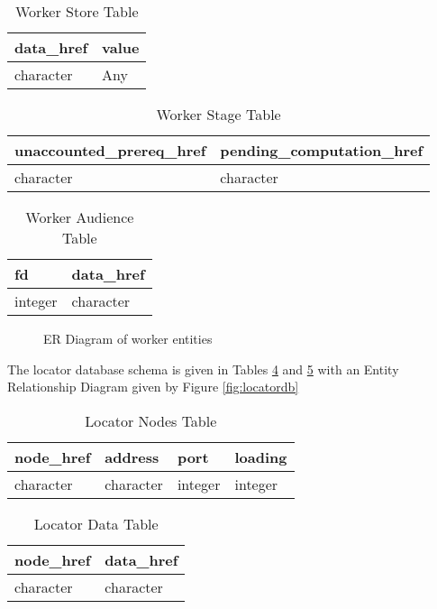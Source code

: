 \begin{table}[]
\caption{Worker Store Table}
\label{tbl:wstore}
\begin{tabular}{@{}ll@{}}
\toprule
data\_href & value \\ \midrule
character  & Any   \\ \bottomrule
\end{tabular}
\end{table}

\begin{table}[]
\caption{Worker Stage Table}
\label{tbl:wstage}
\begin{tabular}{@{}ll@{}}
\toprule
unaccounted\_prereq\_href & pending\_computation\_href \\ \midrule
character                 & character                  \\ \bottomrule
\end{tabular}
\end{table}

\begin{table}[]
\caption{Worker Audience Table}
\label{tbl:waudience}
\begin{tabular}{@{}ll@{}}
\toprule
fd      & data\_href \\ \midrule
integer & character  \\ \bottomrule
\end{tabular}
\end{table}


\begin{figure}

\caption{ER Diagram of worker entities}
\label{fig:workerdb}
\end{figure}

The locator database schema is given in Tables \cref{tbl:lnodes} and \cref{tbl:ldata} with an Entity Relationship Diagram given by Figure \cref{fig:locatordb}


\begin{table}[]
\caption{Locator Nodes Table}
\label{tbl:lnodes}
\begin{tabular}{@{}llll@{}}
\toprule
node\_href & address   & port    & loading \\ \midrule
character  & character & integer & integer \\ \bottomrule
\end{tabular}
\end{table}

\begin{table}[]
\caption{Locator Data Table}
\label{tbl:ldata}
\begin{tabular}{@{}ll@{}}
\toprule
node\_href & data\_href \\ \midrule
character  & character  \\ \bottomrule
\end{tabular}
\end{table}


